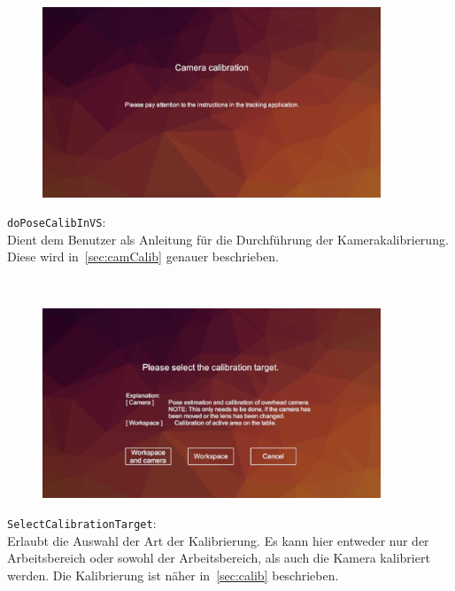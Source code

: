 \begin{minipage}{0.6\textwidth}
	\begin{figure}[H] 
		\includegraphics[trim=3cm 2cm 3cm 2cm, clip, width=0.9\textwidth]{Bilder/doPoseCalibInVS.jpg}
			\label{fig:doPoseCalibInVS}
	\end{figure}
\end{minipage}
\begin{minipage}{0.4\textwidth}
	\texttt{doPoseCalibInVS}:\\
	Dient dem Benutzer als Anleitung für die Durchführung der Kamerakalibrierung. Diese wird in~\ref{sec:camCalib} genauer beschrieben.
\end{minipage}\\

\begin{minipage}{0.6\textwidth}
	\begin{figure}[H] 
		\includegraphics[trim=3cm 1cm 3cm 3cm, clip, width=0.9\textwidth]{Bilder/SelectCalibrationTarget.jpg}
			\label{fig:SelectCalibrationTarget}
	\end{figure}
\end{minipage}
\begin{minipage}{0.4\textwidth}
	\texttt{SelectCalibrationTarget}:\\
	Erlaubt die Auswahl der Art der Kalibrierung. Es kann hier entweder nur der Arbeitsbereich oder sowohl der Arbeitsbereich, als auch die Kamera kalibriert werden. Die Kalibrierung ist näher in~\ref{sec:calib} beschrieben.
\end{minipage}\\


